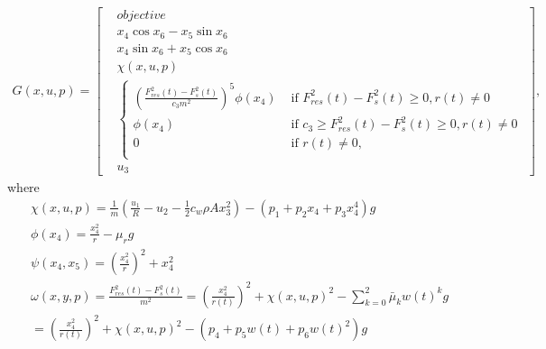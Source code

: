 \documentclass[
10pt, %
a4paper, %
oneside, %
headinclude,footinclude, %
BCOR5mm, %
]{scrartcl}
\begin{document}
\begin{align*}
G(x, u, p) = \begin{bmatrix}
& objective \\
 & x_4 \cos x_6 -  x_5\sin x_6 \\
&  x_4 \sin x_6 +  x_5\cos x_6 \\
&  \chi(x, u, p)\\
&   \begin{cases} \left(\frac{F_{res}^2(t)- F_{s}^2(t)}{c_3m^2}\right)^5 \phi(x_4) & \text{ if } F_{res}^2(t)- F_{s}^2(t)\geq 0, r(t) \neq 0\\
\phi( x_4)  & \text{ if } c_3 \geq F_{res}^2(t)- F_{s}^2(t) \geq 0, r(t) \neq 0\\
0 &   \text{ if } r(t) \neq 0,\\
\end{cases}\\
 & u_3
\end{bmatrix},
\end{align*}
where 
\begin{align*}
&\chi(x, u, p)= \frac{1}{m}\left( \frac{u_1}{R} - u_2 - \frac{1}{2}  c_w  \rho  A x_3^2\right) -\left(p_{1} + p_2 x_4 + p_3 x_4^4 \right) g\\
&\phi( x_4) = \frac{x_4^2}{r}  -  \mu_r g \\
&\psi(x_4, x_5) = \left(\frac{x_4^2}{r}\right)^2+ x_4^2\\
& \omega(x, y, p) = \frac{F_{res}^2(t)- F_{s}^2(t)}{m^2} = \left(\frac{x_4^2}{r(t)}\right)^2+ \chi(x, u, p)^2 -\sum_{k=0}^2 \bar{\mu}_k w(t)^k g  \\
& = \left(\frac{x_4^2}{r(t)}\right)^2+ \chi(x, u, p)^2 -\left(p_4 + p_5 w(t) + p_6 w(t)^2 \right) g  \\
\end{align*}
\end{document}
